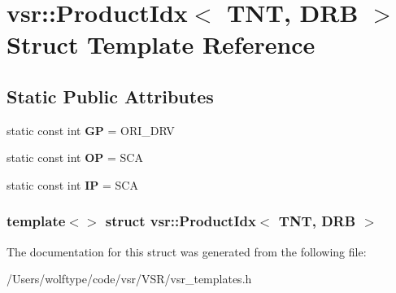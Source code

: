 \hypertarget{structvsr_1_1_product_idx_3_01_t_n_t_00_01_d_r_b_01_4}{\section{vsr\-:\-:Product\-Idx$<$ T\-N\-T, D\-R\-B $>$ Struct Template Reference}
\label{structvsr_1_1_product_idx_3_01_t_n_t_00_01_d_r_b_01_4}
}
\subsection*{Static Public Attributes}
\begin{DoxyCompactItemize}
\item 
\hypertarget{structvsr_1_1_product_idx_3_01_t_n_t_00_01_d_r_b_01_4_aac4af4a47512c40ddabe501846749193}{static const int {\bfseries G\-P} = O\-R\-I\-\_\-\-D\-R\-V}\label{structvsr_1_1_product_idx_3_01_t_n_t_00_01_d_r_b_01_4_aac4af4a47512c40ddabe501846749193}

\item 
\hypertarget{structvsr_1_1_product_idx_3_01_t_n_t_00_01_d_r_b_01_4_a8a3f81b562985695f454d18726d8ed6e}{static const int {\bfseries O\-P} = S\-C\-A}\label{structvsr_1_1_product_idx_3_01_t_n_t_00_01_d_r_b_01_4_a8a3f81b562985695f454d18726d8ed6e}

\item 
\hypertarget{structvsr_1_1_product_idx_3_01_t_n_t_00_01_d_r_b_01_4_aa7f3b4dbf70d616a94b7544eba940e0c}{static const int {\bfseries I\-P} = S\-C\-A}\label{structvsr_1_1_product_idx_3_01_t_n_t_00_01_d_r_b_01_4_aa7f3b4dbf70d616a94b7544eba940e0c}

\end{DoxyCompactItemize}
\subsubsection*{template$<$$>$ struct vsr\-::\-Product\-Idx$<$ T\-N\-T, D\-R\-B $>$}



The documentation for this struct was generated from the following file\-:\begin{DoxyCompactItemize}
\item 
/\-Users/wolftype/code/vsr/\-V\-S\-R/vsr\-\_\-templates.\-h\end{DoxyCompactItemize}
